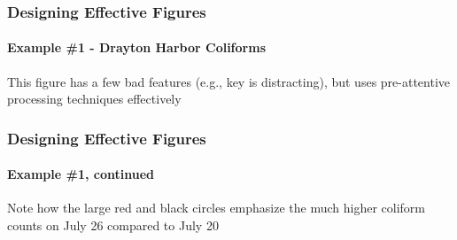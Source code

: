 \documentclass[10pt]{beamer}
\begin{document}
\begin{frame}
\frametitle{Designing Effective Figures}
\framesubtitle{Example \#1 - Drayton Harbor Coliforms}

\begin{center}
\end{center}

\vspace*{-5ex}
        {\scriptsize This figure has a few bad features (e.g., key is distracting),
  but uses pre-attentive processing techniques effectively\\}
\end{frame}


\begin{frame}
\frametitle{Designing Effective Figures}
\framesubtitle{Example \#1, continued}

\begin{center}
\end{center}

\vspace*{-5ex}
{\scriptsize Note how the large red and black circles emphasize the much higher coliform
  counts on July 26 compared to July 20\\}
\end{frame}
\end{document}
